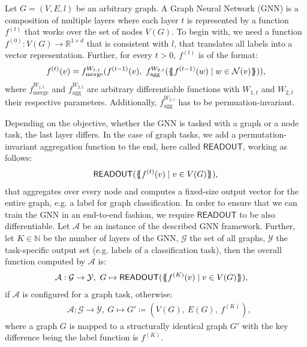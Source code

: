 \begin{definition}\label{def:gnn}
    Let $G = (V, E, l)$ be an arbitrary graph. A Graph Neural Network (GNN) is a composition of multiple layers where each layer $t$ is represented by a function $f^{(t)}$ that works over the set of nodes $V(G)$. To begin with, we need a function $f^{(0)}: V(G) \rightarrow \mathbb{R}^{1 \times d}$ that is consistent with $l$, that translates all labels into a vector representation. Further, for every $t > 0$, $f^{(t)}$ is of the format:
    \begin{align*}
    f^{(t)}(v) = f^{W_{1,t}}_{\text{merge}} (f^{(t-1)}(v), \  f^{W_{2,t}}_{\text{agg}}( \{\!\!\{ f^{(t-1)}(w) \mid w \in \mathcal{N}(v) \}\!\!\} )),
    \end{align*}
    where $f^{W_{1,t}}_{\text{merge}}$ and $f^{W_{2,t}}_{\text{agg}}$ are arbitrary differentiable functions with $W_{1,t}$ and $W_{2,t}$ their respective parameters. Additionally, $f^{W_{2,t}}_{\text{agg}}$ has to be permuation-invariant.

    Depending on the objective, whether the GNN is tasked with a graph or a node task, the last layer differs. In the case of graph tasks, we add a permutation-invariant aggregation function to the end, here called $\textsf{READOUT}$, working as follows:
    \begin{align*}
        \textsf{READOUT}(\{\!\!\{ f^{(t)}(v) \mid v \in V(G) \}\!\!\}),
    \end{align*}
    that aggregates over every node and computes a fixed-size output vector for the entire graph, e.g. a label for graph classification. In order to ensure that we can train the GNN in an end-to-end fashion, we require $\textsf{READOUT}$ to be also differentiable. Let $\mathcal{A}$ be an instance of the described GNN framework. Further, let $K \in \mathbb{N}$ be the number of layers of the GNN, $\mathcal{G}$ the set of all graphs, $\mathcal{Y}$ the task-specific output set (e.g. labels of a classification task), then the overall function computed by $\mathcal{A}$ is:
    \begin{align*}
        &\mathcal{A}: \mathcal{G} \rightarrow \mathcal{Y}, \ G \mapsto \textsf{READOUT}(\{\!\!\{ f^{(K)}(v) \mid v \in V(G) \}\!\!\}),
    \end{align*}
    if $\mathcal{A}$ is configured for a graph task, otherwise:
    \begin{align*}
        &\mathcal{A}: \mathcal{G} \rightarrow \mathcal{Y}, \ G \mapsto G' \coloneqq (V(G), \ E(G), \ f^{(K)}),
    \end{align*}
    where a graph $G$ is mapped to a structurally identical graph $G'$ with the key difference being the label function is $f^{(K)}$.
\end{definition}

